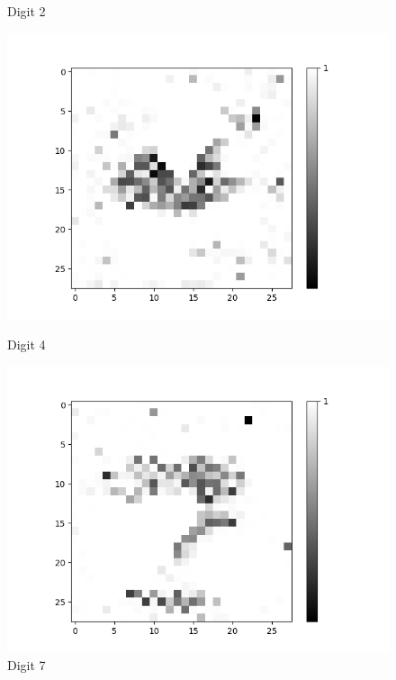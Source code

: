 \begin{figure}[H]
\begin{minipage}[b]{0.19\textwidth}
		\caption{Digit 2}
	\end{minipage}
	\begin{minipage}[b]{0.19\textwidth}
		\includegraphics[width=\textwidth]{AND-OLD(LSM)/Layer0-Neuron-4.png}
		\caption{Digit 4}
	\end{minipage}
	\begin{minipage}[b]{0.19\textwidth}
		\includegraphics[width=\textwidth]{AND-OLD(LSM)/Layer0-Neuron-7.png}
		\caption{Digit 7}
	\end{minipage}
	\begin{minipage}[b]{0.19\textwidth}

\end{minipage}
\end{figure}
